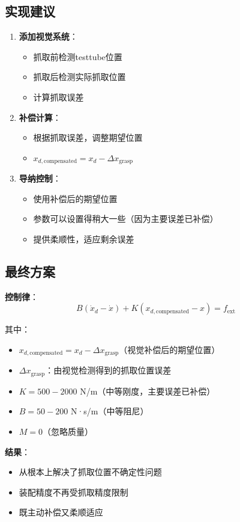 \documentclass[12pt,a4paper]{article}
\begin{document}
\subsection{实现建议}

\begin{enumerate}
\item \textbf{添加视觉系统}：
\begin{itemize}
\item 抓取前检测testtube位置
\item 抓取后检测实际抓取位置
\item 计算抓取误差
\end{itemize}

\item \textbf{补偿计算}：
\begin{itemize}
\item 根据抓取误差，调整期望位置
\item $x_{d,\text{compensated}} = x_d - \Delta x_{\text{grasp}}$
\end{itemize}

\item \textbf{导纳控制}：
\begin{itemize}
\item 使用补偿后的期望位置
\item 参数可以设置得稍大一些（因为主要误差已补偿）
\item 提供柔顺性，适应剩余误差
\end{itemize}
\end{enumerate}

\subsection{最终方案}

\textbf{控制律}：
\begin{equation}
B(\dot{x}_d - \dot{x}) + K(x_{d,\text{compensated}} - x) = f_{\text{ext}}
\end{equation}

其中：
\begin{itemize}
\item $x_{d,\text{compensated}} = x_d - \Delta x_{\text{grasp}}$（视觉补偿后的期望位置）
\item $\Delta x_{\text{grasp}}$：由视觉检测得到的抓取位置误差
\item $K = 500-2000$ N/m（中等刚度，主要误差已补偿）
\item $B = 50-200$ N·s/m（中等阻尼）
\item $M = 0$（忽略质量）
\end{itemize}

\textbf{结果}：
\begin{itemize}
\item 从根本上解决了抓取位置不确定性问题
\item 装配精度不再受抓取精度限制
\item 既主动补偿又柔顺适应
\end{itemize}
\end{document}
